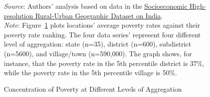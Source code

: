 \documentclass[12pt,letterpaper]{article}
\newcommand{\shrugpath}{.}
\begin{document}
\begin{appendix}
\newpage
\begin{figure}[H]\caption{Concentration of Poverty at Different Levels of Aggregation}
  \begin{center}
  \end{center}

\begin{adjustwidth}{2cm}{2cm}
  \footnotesize{\textit{Source}: Authors' analysis based on data in the
  \href{http://www.devdatalab.org/shrug}{Socioeconomic High-resolution
    Rural-Urban Geographic Dataset on India}. \\ \textit{Note}: Figure~\ref{fig:pov_dist} plots locations' average
    poverty rates against their poverty rate ranking. The four data
    series' represent four different level of aggregation: state
    (n=35), district (n=600), subdistrict (n=5600), and village/town
    (n=590,000). The graph shows, for instance, that the poverty rate
    in the 5th percentile district is 37\%, while the poverty rate in
    the 5th percentile village is 50\%.}

\end{adjustwidth}

\label{fig:pov_dist}
\end{figure}


\end{appendix}
\end{document}
